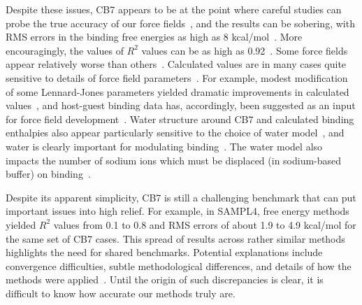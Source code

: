 \documentclass[aps,pre,twocolumn,nofootinbib,superscriptaddress,10pt, final,tightenlines]{revtex4-1}
\begin{document}
Despite these issues, CB7 appears to be at the point where careful studies can probe the true accuracy of our force fields~\cite{henriksen_computational_2015, gao_binding_2015, yin_toward_2015}, and the results can be sobering, with RMS errors in the binding free energies as high as 8 kcal/mol~\cite{henriksen_computational_2015, monroe_converging_2014}. More encouragingly, the values of $R^2$ values can be as high as 0.92~\cite{henriksen_computational_2015}. 
Some force fields appear relatively worse than others~\cite{hsiao_prediction_2014, muddana_prediction_2012}.
Calculated values are in many cases quite sensitive to details of force field parameters~\cite{monroe_converging_2014, moghaddam_new_2011, muddana_prediction_2012}. For example, modest modification of some Lennard-Jones parameters yielded dramatic improvements in calculated values~\cite{yin_toward_2015}, and host-guest binding data has, accordingly, been suggested as an input for force field development~\cite{yin_toward_2015, henriksen_computational_2015, gao_binding_2015}.
Water structure around CB7 and calculated binding enthalpies also appear particularly sensitive to the choice of water model~\cite{rogers_role_2013, fenley_bridging_2014, gao_binding_2015}, and water is clearly important for modulating binding~\cite{nguyen_grid_2012}.
The water model also impacts the number of sodium ions which must be displaced (in sodium-based buffer) on binding~\cite{gao_binding_2015, henriksen_computational_2015}.

Despite its apparent simplicity, CB7 is still a challenging benchmark that can put important issues into high relief. For example, in SAMPL4, free energy methods yielded $R^2$ values from 0.1 to 0.8 and RMS errors of about 1.9 to 4.9 kcal/mol for the same set of CB7 cases. This spread of results across rather similar methods highlights the need for shared benchmarks. Potential explanations include convergence difficulties, subtle methodological differences, and details of how the methods were applied~\cite{muddana_sampl4_2014}. Until the origin of such discrepancies is clear, it is difficult to know how accurate our methods truly are. 
\end{document}
